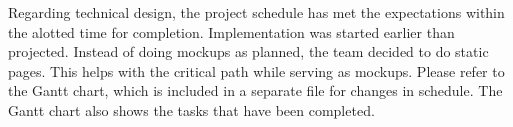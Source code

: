 

Regarding technical design, the project schedule has met the expectations within
the alotted time for completion. Implementation was started earlier than
projected. Instead of doing mockups as planned, the team decided to do static
pages. This helps with the critical path while serving as mockups. Please refer
to the Gantt chart, which is included in a separate file for changes in
schedule. The Gantt chart also shows the tasks that have been completed.

